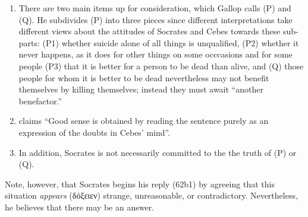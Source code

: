 \documentclass[12pt,letterpaper]{article}
\begin{document}
\begin{enumerate}
    \item There are two main items up for consideration, which Gallop calls (P) and (Q). He subdivides (P) into three pieces since different interpretations take different views about the attitudes of Socrates and Cebes towards these sub-parts: (P1) whether suicide alone of all things is unqualified, (P2) whether it never happens, as it does for other things on some occcasions and for some people (P3) that it is better for a person to be dead than alive, and (Q) those people for whom it is better to be dead nevertheless may not benefit themselves by killing themselves; instead they must await ``another benefactor.''
    \item \textcite[82]{gallop1975} claims ``Good sense is obtained by reading the sentence purely as an expression of the doubts in Cebes' mind''.
    \item In addition, Socrates is not necessarily committed to the the truth of (P) or (Q).
\end{enumerate}

Note, however, that Socrates begins his reply (62b1) by agreeing that this situation \textit{appears} (\textgreek{δόξειεν}) strange, unreasonable, or contradictory. Nevertheless, he believes that there may be an answer.


\newpage
\printbibliography
\end{document}
